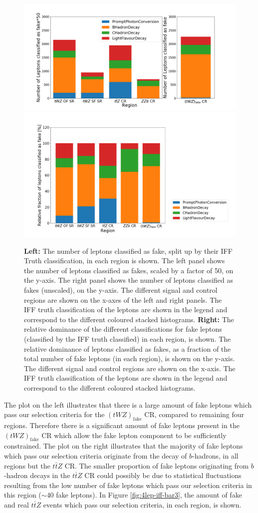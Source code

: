 \begin{figure}[htbp]
\centering

    \includegraphics[width=.45\textwidth]{figures/iff_bar_1.png}   
     \includegraphics[width=.45\textwidth]{figures/iff_bar_2.png} 

    \caption{\textbf{Left: }The number of leptons classified as fake, split up by their IFF Truth classification, in each region is shown. The left panel shows the number of leptons classified as fakes, scaled by a factor of 50, on the y-axis. The right panel shows the number of leptons classified as fakes (unscaled), on the y-axis. The different signal and control regions are shown on the x-axes of the left and right panels. The IFF truth classification of the leptons are shown in the legend and correspond to the different coloured stacked histograms. \textbf{Right: }The relative dominance of the different classifications for fake leptons (classified by the IFF truth classified) in each region, is shown. The relative dominance of leptons classified as fakes, as a fraction of the total number of fake leptons (in each region), is shown on the y-axis. The different signal and control regions are shown on the x-axis. The IFF truth classification of the leptons are shown in the legend and correspond to the different coloured stacked histograms.}
  \label{fig:4lep-iff-bar1}
\end{figure}
The plot on the left illustrates that there is a large amount of fake leptons which pass our selection criteria for the $(tWZ)_{\text{fake}}$ CR, compared to remaining four regions. Therefore there is a significant amount of fake leptons present in the $(tWZ)_{\text{fake}}$ CR which allow the fake lepton component to be sufficiently constrained. The plot on the right illustrates that the majority of fake leptons which pass our selection criteria originate from the decay of $b$-hadrons, in all regions but the $t\bar{t}Z$ CR. The smaller proportion of fake leptons originating from $b$-hadron decays in the $t\bar{t}Z$ CR could possibly be due to statistical fluctuations resulting from the low number of fake leptons which pass our selection criteria in this region ($\sim 40$ fake leptons). In Figure \ref{fig:4lep-iff-bar3}, the amount of fake and real $t\bar{t}Z$ events which pass our selection criteria, in each region, is shown.


